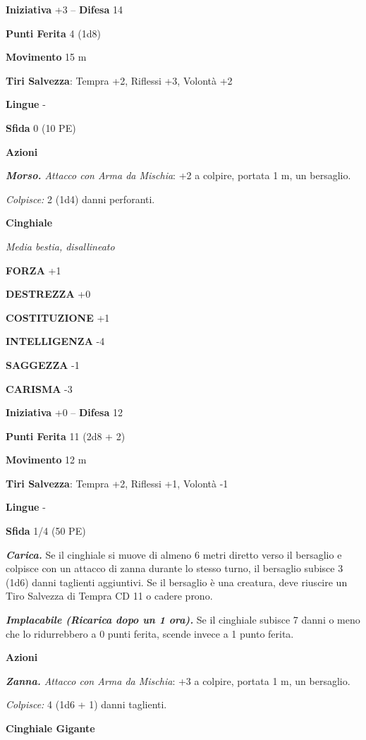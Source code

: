 \begin{multicols}{2}
\textbf{Iniziativa} +3 -- \textbf{Difesa} 14

\textbf{Punti Ferita} 4 (1d8)

\textbf{Movimento} 15 m

\textbf{Tiri Salvezza}: Tempra +2, Riflessi +3, Volontà +2 

\textbf{Lingue} -

\textbf{Sfida} 0 (10 PE)

\textbf{Azioni}

\emph{\textbf{Morso.} Attacco con Arma da Mischia}: +2 a colpire, portata 1 m, un bersaglio.

\emph{Colpisce:} 2 (1d4) danni perforanti.

\medskip\textbf{Cinghiale}

\emph{Media bestia, disallineato}

\textbf{FORZA} +1

\textbf{DESTREZZA} +0

\textbf{COSTITUZIONE} +1

\textbf{INTELLIGENZA} -4

\textbf{SAGGEZZA} -1

\textbf{CARISMA} -3

\textbf{Iniziativa} +0 -- \textbf{Difesa} 12

\textbf{Punti Ferita} 11 (2d8 + 2)

\textbf{Movimento} 12 m

\textbf{Tiri Salvezza}: Tempra +2, Riflessi +1, Volontà -1 

\textbf{Lingue} -

\textbf{Sfida} 1/4 (50 PE)

\emph{\textbf{Carica.}} Se il cinghiale si muove di almeno 6 metri diretto verso il bersaglio e colpisce con un attacco di zanna durante lo stesso turno, il bersaglio subisce 3 (1d6) danni taglienti aggiuntivi. Se il bersaglio è una creatura, deve riuscire un Tiro Salvezza di Tempra
CD 11 o cadere prono.

\emph{\textbf{Implacabile (Ricarica dopo un 1 ora).}} Se il cinghiale subisce 7 danni o meno che lo ridurrebbero a 0 punti ferita, scende invece a 1 punto ferita.

\textbf{Azioni}

\emph{\textbf{Zanna.} Attacco con Arma da Mischia}: +3 a colpire, portata 1 m, un bersaglio.

\emph{Colpisce:} 4 (1d6 + 1) danni taglienti.

\medskip\textbf{Cinghiale Gigante}


\end{multicols}
